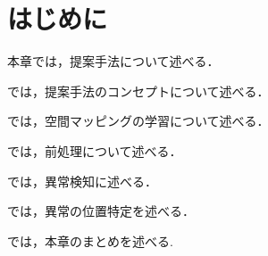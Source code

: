 \documentclass[../main]{subfiles}
\begin{document}
\section{はじめに}
\label{sec:pmethod_introduction}

本章では，提案手法について述べる．

では，提案手法のコンセプトについて述べる．

では，空間マッピングの学習について述べる．

では，前処理について述べる．

では，異常検知に述べる．

では，異常の位置特定を述べる．

では，本章のまとめを述べる.
\end{document}
